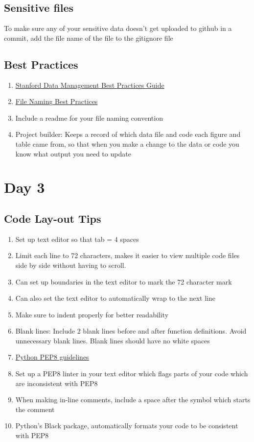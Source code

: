 \documentclass{article}
\begin{document}
\subsection{Sensitive files}
To make sure any of your sensitive data doesn’t get uploaded to github in a commit, add the file name of the file to the gitignore file

\subsection{Best Practices}
\begin{enumerate}
	\item \href{https://library.stanford.edu/research/data-management-services/data-best-practices}{Stanford Data Management Best Practices Guide}
	\item \href{https://library.stanford.edu/research/data-management-services/data-best-practices/best-practices-file-naming}{File Naming Best Practices}
	\item Include a readme for your file naming convention
	\item Project builder: Keeps a record of which data file and code each figure and table came from, so that when you make a change to the data or code you know what output you need to update
\end{enumerate}
\clearpage
\section{Day 3}
\subsection{Code Lay-out Tips}
\begin{enumerate}
	\item Set up text editor so that tab = 4 spaces
	\item Limit each line to 72 characters, makes it easier to view multiple code files side by side without having to scroll. 
	\item Can set up boundaries in the text editor to mark the 72 character mark
	\item Can also set the text editor to automatically wrap to the next line
	\item Make sure to indent properly for better readability
	\item Blank lines: Include 2 blank lines before and after function definitions. Avoid unnecessary blank lines. Blank lines should have no white spaces
	\item \href{https://www.python.org/dev/peps/pep-0008/}{Python PEP8 guidelines} 
	\item Set up a PEP8 linter in your text editor which flags parts of your code which are inconsistent with PEP8
	\item When making in-line comments, include a space after the symbol which starts the comment
	\item Python’s Black package, automatically formats your code to be consistent with PEP8
\end{enumerate}
\end{document}
